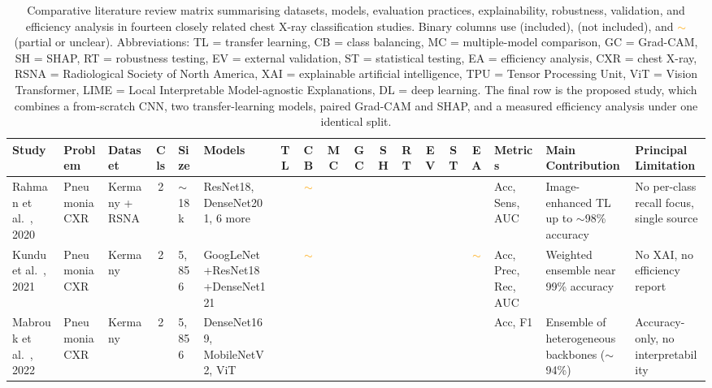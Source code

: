 \documentclass[preprint,12pt]{elsarticle}
\newcommand{\cmark}{\ding{51}} %
\newcommand{\xmark}{\ding{55}} %
\newcommand{\pmark}{\textcolor{orange}{$\sim$}} %
\begin{document}
\begin{table}
\centering
\tiny
\caption{Comparative literature review matrix summarising datasets, models, evaluation practices, explainability, robustness, validation, and efficiency analysis in fourteen closely related chest X-ray classification studies. Binary columns use \cmark{} (included), \xmark{} (not included), and \pmark{} (partial or unclear). Abbreviations: TL = transfer learning, CB = class balancing, MC = multiple-model comparison, GC = Grad-CAM, SH = SHAP, RT = robustness testing, EV = external validation, ST = statistical testing, EA = efficiency analysis, CXR = chest X-ray, RSNA = Radiological Society of North America, XAI = explainable artificial intelligence, TPU = Tensor Processing Unit, ViT = Vision Transformer, LIME = Local Interpretable Model-agnostic Explanations, DL = deep learning. The final row is the proposed study, which combines a from-scratch CNN, two transfer-learning models, paired Grad-CAM and SHAP, and a measured efficiency analysis under one identical split.}
\label{tab:literature_matrix}
\begin{adjustbox}{max width=\textwidth}
\begin{tabular}{p{1.5cm} p{1.7cm} p{1.4cm} c p{1.0cm} p{1.9cm} c c c c c c c c c p{1.7cm} p{2.4cm} p{2.4cm}}
\toprule
\textbf{Study} & \textbf{Problem} & \textbf{Dataset} & \textbf{Cls} & \textbf{Size} & \textbf{Models} & \textbf{TL} & \textbf{CB} & \textbf{MC} & \textbf{GC} & \textbf{SH} & \textbf{RT} & \textbf{EV} & \textbf{ST} & \textbf{EA} & \textbf{Metrics} & \textbf{Main Contribution} & \textbf{Principal Limitation} \\
\midrule
Rahman et al.~\cite{rahman2020transfer}, 2020 & Pneumonia CXR & Kermany + RSNA & 2 & $\sim$18k & ResNet18, DenseNet201, 6 more & \cmark & \pmark & \cmark & \xmark & \xmark & \xmark & \xmark & \xmark & \xmark & Acc, Sens, AUC & Image-enhanced TL up to $\sim$98\% accuracy & No per-class recall focus, single source \\
Kundu et al.~\cite{kundu2021pneumonia}, 2021 & Pneumonia CXR & Kermany & 2 & 5{,}856 & GoogLeNet+ResNet18+DenseNet121 & \cmark & \pmark & \cmark & \xmark & \xmark & \xmark & \xmark & \xmark & \pmark & Acc, Prec, Rec, AUC & Weighted ensemble near 99\% accuracy & No XAI, no efficiency report \\
Mabrouk et al.~\cite{mabrouk2022pneumonia}, 2022 & Pneumonia CXR & Kermany & 2 & 5{,}856 & DenseNet169, MobileNetV2, ViT & \cmark & \xmark & \cmark & \xmark & \xmark & \xmark & \xmark & \xmark & \xmark & Acc, F1 & Ensemble of heterogeneous backbones ($\sim$94\%) & Accuracy-only, no interpretability \\

\end{tabular}
\end{adjustbox}
\end{table}
\end{document}
